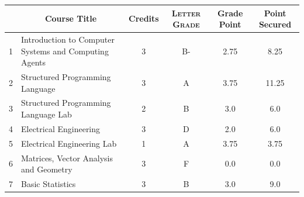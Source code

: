 \documentclass[11pt]{article}
\newcommand*{\numtwo}[1]{\pgfmathprintnumber[
                    fixed, precision=2, fixed zerofill=true]{#1}}
\begin{document}
                \begin{center}
                    \renewcommand{\arraystretch}{1.08}
                    
                \begin{tabular}{|c|l|c|>{\scshape}c|c|c|}
                \hline  \rule[-1ex]{0pt}{3.5ex} {\centering{\bf Course Code}} &  \multicolumn{1}{c|}{\textbf{Course Title}}  & {\bf Credits} & {\bf Letter Grade} & {\bf Grade Point} & {\bf Point Secured}  \\ 
                \hline   1 &  Introduction to Computer Systems and Computing Agents		 & 3 & B- & 2.75 & 8.25 \\ %
                \hline   2 &  Structured Programming Language		 & 3 & A & 3.75 & 11.25 \\ %
                \hline   3 &  Structured Programming Language Lab		 & 2 & B & 3.0 & 6.0 \\ %
                \hline   4 &  Electrical Engineering		 & 3 & D & 2.0 & 6.0 \\ %
                \hline   5 &  Electrical Engineering Lab		 & 1 & A & 3.75 & 3.75 \\ %
                \hline   6 &  Matrices, Vector Analysis and Geometry		 & 3 & F & 0.0 & 0.0 \\ %
                \hline   7 &  Basic Statistics		 & 3 & B & 3.0 & 9.0 \\ %

\hline                %
                \end{tabular}
                \end{center}
                \renewcommand{\arraystretch}{1.03}
\end{document}

